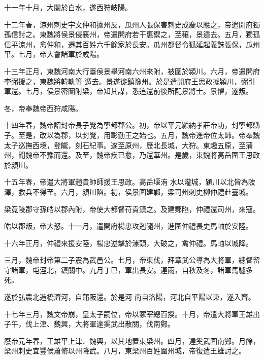 \begin{pinyinscope}
 十一年十月，大閱於白水，遂西狩岐陽。



 十二年春，涼州刺史宇文仲和據州反，瓜州人張保害刺史成慶以應之，帝遣開府獨孤信討之。東魏將侯景侵襄州，帝遣開府若干惠禦之，至穰，景遁去。五月，獨孤信平涼州，禽仲和，遷其百姓六千餘家於長安。瓜州都督令狐延起義誅張保，瓜州平。七月，帝大會諸軍於咸陽。



 十三年正月，東魏河南大行臺侯景舉河南六州來附，被圍於潁川。六月，帝遣開府李弼援之，東魏將韓軌等
 遁去。景遂徙鎮豫州。於是遣開府王思政據潁川，弼引軍還。七月，侯景密圖附梁，帝知其謀，悉追還前後所配景將士。景懼，遂叛。



 冬，帝奉魏帝西狩咸陽。



 十四年春，魏帝詔封帝長子覺為寧都郡公。初，帝以平元顥納孝莊帝功，封寧都縣子。至是，改以為郡，以封覺，用彰勤王之始也。五月，魏帝進帝位太師。帝奉魏太子巡撫西境，登隴，刻石紀事。遂至原州，歷北長城，大狩。東趣五原，至蒲州，聞魏帝不豫而還。及至，魏帝疾已愈，乃還華州。是歲，東魏將高岳圍王思政於潁川。



 十五年春，帝遣大將軍趙貴帥師援王思政。高岳堰洧
 水以灌城，潁川以北皆為陂澤，救兵不得至。六月，潁川陷。初，侯景圍建鄴，梁司州刺史柳仲禮赴臺城。



 梁竟陵郡守孫皓以郡內附，帝使大都督苻貴鎮之。及建鄴陷，仲禮還司州，來寇。



 皓以郡叛，帝大怒。十一月，遣開府楊忠攻剋隨州，進圍仲禮長史馬岫於安陸。



 十六年正月，仲禮來援安陸，楊忠逆擊於漴頭，大破之，禽仲禮。馬岫以城降。



 三月，魏帝封帝第二子震為武邑公。七月，帝東伐，拜章武公導為大將軍，總督留守諸軍，屯涇北，鎮關中。九月丁巳，軍出長安。連雨，自秋及冬，諸軍馬驢多死。



 遂於弘農北造橋濟河，自蒲阪還。於是河
 南自洛陽，河北自平陽以東，遂入齊。



 十七年三月，魏文帝崩，皇太子嗣位，帝以冢宰總百揆。十月，帝遣大將軍王雄出子午，伐上津、魏興，大將軍達奚武出散關，伐南鄭。



 廢帝元年春，王雄平上津、魏興，以其地置東梁州。四月，達奚武圍南鄭。月餘，梁州刺史宜豐侯蕭脩以州降武。八月，東梁州百姓圍州城，帝復遣王雄討之。




\end{pinyinscope}
